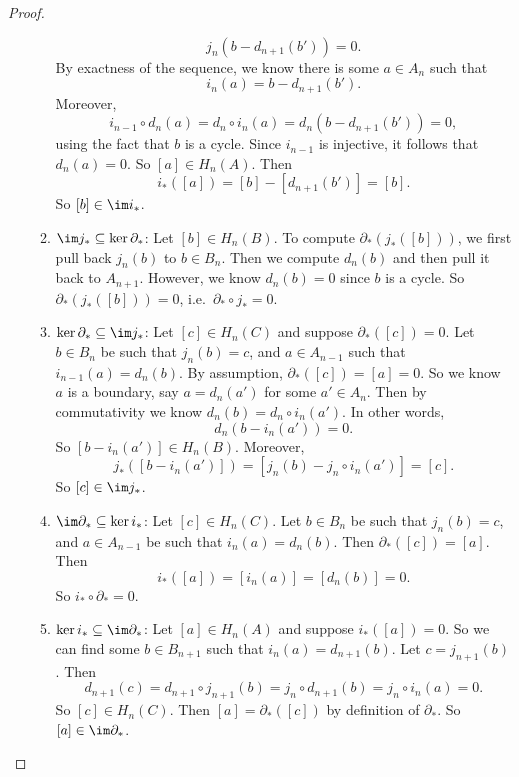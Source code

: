 \documentclass[a4paper]{article}
\begin{document}
\begin{proof}
\begin{enumerate}
\begin{enumerate}
          \[
            j_n (b - d_{n + 1}(b')) = 0.
          \]
          By exactness of the sequence, we know there is some $a \in A_n$ such that
          \[
            i_n(a) = b - d_{n + 1}(b').
          \]
          Moreover,
          \[
            i_{n - 1} \circ d_n(a) = d_n \circ i_n (a) = d_n(b - d_{n + 1}(b')) = 0,
          \]
          using the fact that $b$ is a cycle. Since $i_{n - 1}$ is injective, it follows that $d_n(a) = 0$. So $[a] \in H_n(A)$. Then
          \[
            i_*([a]) = [b] - [d_{n + 1}(b')] = [b].
          \]
          So $[b] \in \im i_*$.
        \item $\im j_* \subseteq \ker \partial_*$: Let $[b] \in H_n(B)$. To compute $\partial_*(j_*([b]))$, we first pull back $j_n(b)$ to $b \in B_n$. Then we compute $d_n(b)$ and then pull it back to $A_{n + 1}$. However, we know $d_n(b) = 0$ since $b$ is a cycle. So $\partial_*(j_*([b])) = 0$, i.e.\ $\partial_* \circ j_* = 0$.
        \item $\ker \partial_* \subseteq \im j_*$: Let $[c] \in H_n(C)$ and suppose $\partial_*([c]) = 0$. Let $b \in B_n$ be such that $j_n(b) = c$, and $a \in A_{n - 1}$ such that $i_{n - 1}(a) = d_n(b)$. By assumption, $\partial_*([c]) = [a] = 0$. So we know $a$ is a boundary, say $a = d_n (a')$ for some $a' \in A_n$. Then by commutativity we know $d_n(b) = d_n \circ i_n (a')$. In other words,
          \[
            d_n(b - i_n(a')) = 0.
          \]
          So $[b - i_n(a')] \in H_n(B)$. Moreover,
          \[
            j_*([b - i_n(a')]) = [j_n(b) - j_n \circ i_n(a')] = [c].
          \]
          So $[c] \in \im j_*$.
        \item $\im \partial_* \subseteq \ker i_*$: Let $[c] \in H_n(C)$. Let $b \in B_n$ be such that $j_n(b) = c$, and $a \in A_{n - 1}$ be such that $i_n(a) = d_n(b)$. Then $\partial_*([c]) = [a]$. Then
          \[
            i_*([a]) = [i_n(a)] = [d_n(b)] = 0.
          \]
          So $i_* \circ \partial_* = 0$.
        \item $\ker i_* \subseteq \im \partial_*$: Let $[a] \in H_n(A)$ and suppose $i_*([a]) = 0$. So we can find some $b \in B_{n + 1}$ such that $i_n(a) = d_{n + 1}(b)$. Let $c = j_{n + 1}(b)$. Then
          \[
            d_{n + 1}(c) = d_{n + 1}\circ j_{n + 1} (b) = j_n \circ d_{n + 1}(b) = j_n \circ i_n (a) = 0.
          \]
          So $[c] \in H_n(C)$. Then $[a] = \partial_*([c])$ by definition of $\partial_*$. So $[a] \in \im \partial_*$.\qedhere
      \end{enumerate}%
  \end{enumerate}
\end{proof}
\end{document}
